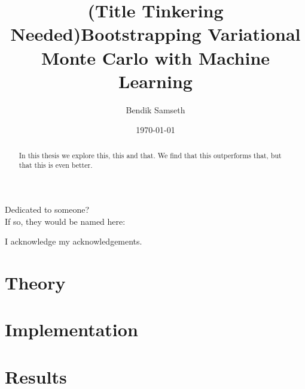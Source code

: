 \documentclass[twoside,english]{uiofysmaster}
\author{Bendik Samseth}
\title{(Title Tinkering Needed)Bootstrapping Variational Monte Carlo with Machine Learning}
\date{\monthyeardate\today}
\begin{document}
\maketitle

\begin{abstract}
    In this thesis we explore this, this and that. We find that this outperforms that, but that this is even better.
\end{abstract}


\begin{dedication}
  Dedicated to someone?
  \\\vspace{12pt}
  If so, they would be named here:
\end{dedication}

\begin{acknowledgements}
  I acknowledge my acknowledgements.
\end{acknowledgements}

\tableofcontents



\part{Theory}





\part{Implementation}




\part{Results}



\printbibliography[heading=bibintoc, title={References}]
\end{document}
